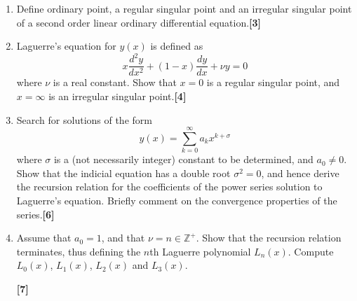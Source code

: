 \documentclass[a4paper]{article}
\begin{document}
\newpage
\begin{qns}\leavevmode
\begin{enumerate}[label=(\alph*)]
\item Define ordinary point, a regular singular point and an irregular singular point of a second order linear ordinary differential equation.\hfill \textbf{[3]}
\item Laguerre's equation for $y(x)$ is defined as
$$x\frac{d^2y}{dx^2}+(1-x)\frac{dy}{dx}+\nu y=0$$
where $\nu$ is a real constant. Show that $x=0$ is a regular singular point, and $x=\infty$ is an irregular singular point.\hfill \textbf{[4]}
\item Search for solutions of the form $$y(x)=\sum_{k=0}^\infty a_kx^{k+\sigma}$$
where $\sigma$ is a (not necessarily integer) constant to be determined, and $a_0\neq 0$. Show that the indicial equation has a double root $\sigma^2=0$, and hence derive the recursion relation for the coefficients of the power series solution to Laguerre's equation. Briefly comment on the convergence properties of the series.\hfill \textbf{[6]}
\item Assume that $a_0=1$, and that $\nu=n\in\mathbb{Z}^+$. Show that the recursion relation terminates, thus defining the $n$th Laguerre polynomial $L_n(x)$. Compute $L_0(x)$, $L_1(x)$, $L_2(x)$ and $L_3(x)$.

\hfill \textbf{[7]}
\end{enumerate}
\end{qns}
\end{document}
